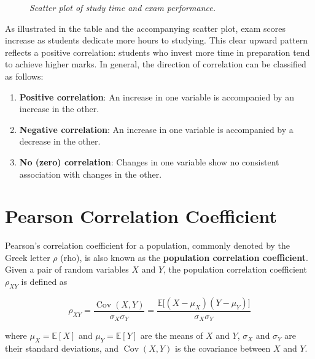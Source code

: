 \documentclass[twoside]{book}
\begin{document}
\begin{figure}[h!]
	\centering
	\caption{\textit{Scatter plot of study time and exam performance.}}
\end{figure}




As illustrated in the table and the accompanying scatter plot, exam scores increase as students dedicate more hours to studying. This clear upward pattern reflects a positive correlation: students who invest more time in preparation tend to achieve higher marks.  In general, the direction of correlation can be classified as follows:

\begin{enumerate}
	\item \textbf{Positive correlation}: An increase in one variable is accompanied by an increase in the other.
	\item \textbf{Negative correlation}: An increase in one variable is accompanied by a decrease in the other.
	\item \textbf{No (zero) correlation}: Changes in one variable show no consistent association with changes in the other.
\end{enumerate}


\section{Pearson Correlation Coefficient}

Pearson's correlation coefficient for a population, commonly denoted by the Greek letter \(\rho\) (rho), is also known as the \textbf{population correlation coefficient}. Given a pair of random variables \(X\) and \(Y\), the population correlation coefficient \(\rho_{XY}\) is defined as

\begin{textbox}
\[
\rho_{XY} = \frac{\operatorname{Cov}(X,Y)}{\sigma_X \sigma_Y} = \frac{\mathbb{E}\big[(X - \mu_X)(Y - \mu_Y)\big]}{\sigma_X \sigma_Y}
\]
\end{textbox}
where \(\mu_X = \mathbb{E}[X]\) and \(\mu_Y = \mathbb{E}[Y]\) are the means of \(X\) and \(Y\), \(\sigma_X\) and \(\sigma_Y\) are their standard deviations, and \(\operatorname{Cov}(X,Y)\) is the covariance between \(X\) and \(Y\).
\end{document}
